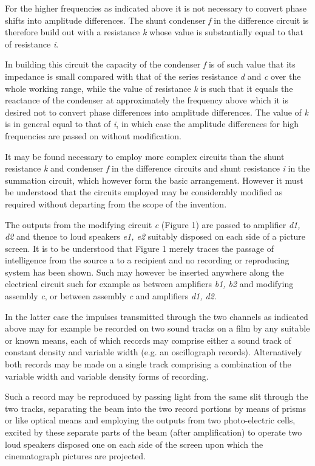 \documentclass[11pt]{article}
\begin{document}
\begin{multicols*}{2}
For the higher frequencies as indicated above it is not necessary to convert phase shifts into amplitude differences. The shunt condenser \textit{f} in the difference circuit is therefore build  out with a resistance \textit{k} whose value is substantially equal to that of resistance \textit{i}. 

In building this circuit the capacity of the condenser \textit{f} is of such value that its impedance is small compared with that of the series resistance \textit{d} and \textit{c} over the whole working range, while the value of resistance \textit{k} is such that it equals the reactance of the condenser at approximately the frequency above which it is desired not to convert phase differences into amplitude differences. The value of \textit{k} is in general equal to that of \textit{i}, in which case the amplitude differences for high frequencies are passed on without modification.

It may be found necessary to employ more complex circuits than the shunt resistance \textit{k} and condenser \textit{f} in the difference circuits and shunt resistance \textit{i} in the summation circuit, which however form the basic arrangement. However it must be understood that the circuits employed may be considerably modified as required without departing from the scope of the invention.

The outputs from the modifying circuit \textit{c} (Figure 1) are passed to amplifier \textit{d1, d2} and thence to loud speakers \textit{e1, e2} suitably disposed on each side of a picture screen. It is to be understood that Figure 1 merely traces the passage of intelligence from the source a to a recipient and no recording or reproducing system has been shown. Such may however be inserted anywhere along the electrical circuit such for example as between amplifiers \textit{b1, b2} and modifying assembly \textit{c}, or between assembly \textit{c} and amplifiers \textit{d1, d2}. 

In the latter case the impulses transmitted through the two channels as indicated above may for example be recorded on two sound tracks on a film by any suitable or known means, each of which records may comprise either a sound track of constant density and variable width (e.g. an oscillograph records). Alternatively both records may be made on a single track comprising a combination of the variable width and variable density forms of recording.

Such a record may be reproduced by passing light from the same slit through the two tracks, separating the beam into the two record portions by means of prisms or like optical means and employing the outputs from two photo-electric cells, excited by these separate parts of the beam (after amplification) to operate two loud speakers disposed one on each side of the screen upon which the cinematograph pictures are projected.


\end{multicols*}
\end{document}
